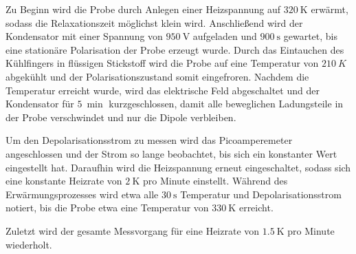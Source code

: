 Zu Beginn wird die Probe durch Anlegen einer Heizspannung auf $\SI{320}{\K}$ erwärmt, sodass die Relaxationszeit möglichst klein wird.
Anschließend wird der Kondensator mit einer Spannung von $\SI{950}{\V}$ aufgeladen und $\SI{900}{\s}$ gewartet, bis eine stationäre Polarisation der Probe erzeugt wurde.
Durch das Eintauchen des Kühlfingers in flüssigen Stickstoff wird die Probe auf eine Temperatur von $\SI{210}{K}$ abgekühlt und der Polarisationszustand somit eingefroren.
Nachdem die Temperatur erreicht wurde, wird das elektrische Feld abgeschaltet und der Kondensator für $\SI{5}{\min}$ kurzgeschlossen, damit alle beweglichen Ladungsteile in der Probe verschwindet und nur die Dipole verbleiben.

Um den Depolarisationsstrom zu messen wird das Picoamperemeter angeschlossen und der Strom so lange beobachtet, bis sich ein konstanter Wert eingestellt hat.
Daraufhin wird die Heizspannung erneut eingeschaltet, sodass sich eine konstante Heizrate von $\SI{2}{\K}$ pro Minute einstellt.
Während des Erwärmungsprozesses wird etwa alle $\SI{30}{\s}$ Temperatur und Depolarisationsstrom notiert, bis die Probe etwa eine Temperatur von $\SI{330}{\K}$ erreicht.

Zuletzt wird der gesamte Messvorgang für eine Heizrate von $\SI{1,5}{\K}$ pro Minute wiederholt.

